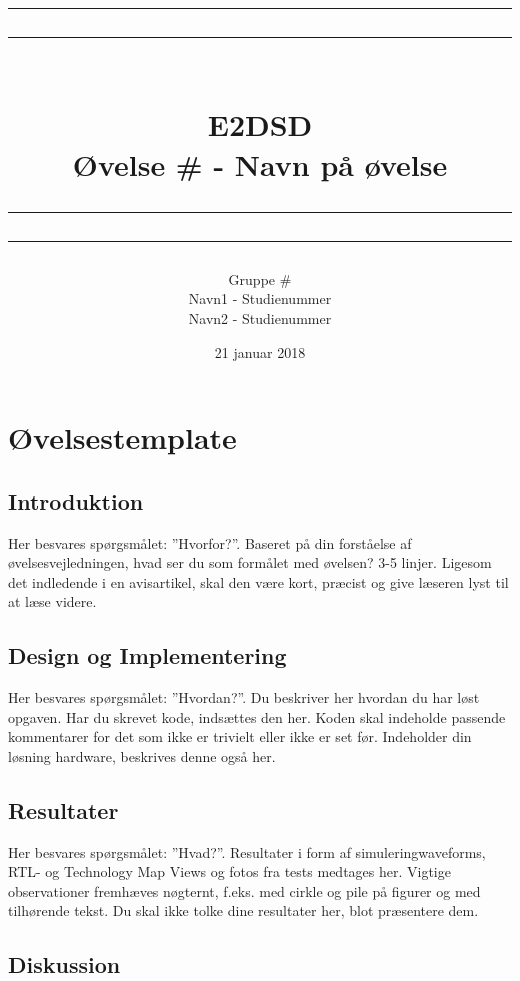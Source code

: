 \documentclass[12pt,a4paper]{article}
\newcommand\mymaketitle[1]{
   \rule{\textwidth}{1.6pt}\vspace*{-\baselineskip}\vspace*{2pt}
   \rule{\textwidth}{0.4pt}
   \\   
   \huge \bf #1\\
   \vspace{-8pt}
   \rule{\textwidth}{0.4pt}\vspace*{-\baselineskip}\vspace{3.2pt}
   \rule{\textwidth}{1.6pt}
}
\begin{document}
\title{
	\mymaketitle{E2DSD\\Øvelse \# - Navn på øvelse}
}
\author{
	Gruppe \#\\
	Navn1 - Studienummer\\
	Navn2 - Studienummer
}
\date{21 januar 2018}

\maketitle

\section{Øvelsestemplate}

\subsection{Introduktion}

Her besvares spørgsmålet: ”Hvorfor?”.  Baseret på din forståelse af
øvelsesvejledningen, hvad ser du som formålet med øvelsen?  3-5 linjer. 
Ligesom det indledende i en avisartikel, skal den være kort, præcist og give
læseren lyst til at læse videre.

\subsection{Design og Implementering}

Her besvares spørgsmålet: ”Hvordan?”.  Du beskriver her hvordan du har løst
opgaven.  Har du skrevet kode, indsættes den her.  Koden skal indeholde
passende kommentarer for det som ikke er trivielt eller ikke er set før. 
Indeholder din løsning hardware, beskrives denne også her.

\subsection{Resultater}

Her besvares spørgsmålet: ”Hvad?”.  Resultater i form af
simuleringwaveforms, RTL- og Technology Map Views og fotos fra tests
medtages her.  Vigtige observationer fremhæves nøgternt, f.eks.  med cirkle
og pile på figurer og med tilhørende tekst.  Du skal ikke tolke dine
resultater her, blot præsentere dem.

\subsection{Diskussion}
\end{document}
